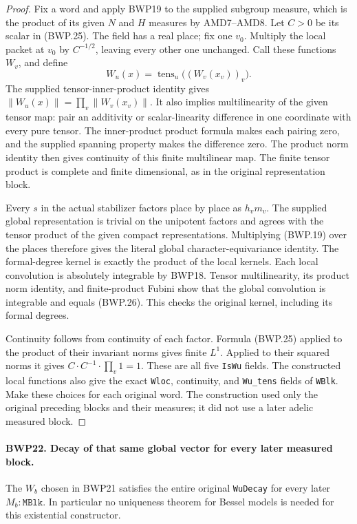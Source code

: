 \documentclass[11pt,a4paper]{article}
\numberwithin{equation}{section}
\theoremstyle{remark}\newtheorem{remark}[theorem]{Remark}
\begin{document}
\begin{proof}
Fix a word and apply BWP19 to the supplied subgroup measure,
which is the product of its given \(N\) and \(H\) measures by
AMD7--AMD8.  Let \(C>0\) be its scalar in (BWP.25).  The field
has a real place; fix one \(v_0\).  Multiply the local packet at
\(v_0\) by \(C^{-1/2}\), leaving every other one unchanged.
Call these functions \(W_v\), and define
\[
 W_u(x)=\operatorname{tens}_u\bigl((W_v(x_v))_v\bigr).
 \tag{BWP.26}
\]
The supplied tensor-inner-product identity gives
\(\|W_u(x)\|=\prod_v\|W_v(x_v)\|\).
It also implies multilinearity of the given tensor map: pair an
additivity or scalar-linearity difference in one coordinate with
every pure tensor.  The inner-product product formula makes each
pairing zero, and the supplied spanning property makes the difference
zero.  The product norm identity then gives continuity of this
finite multilinear map.
The finite tensor product is complete and finite dimensional,
as in the original representation block.

Every \(s\) in the actual stabilizer factors place by place as
\(h_vm_v\).  The supplied global representation is trivial on
the unipotent factors and agrees with the tensor product of the given
compact representations.  Multiplying (BWP.19) over the places
therefore gives the literal global character-equivariance identity.
The formal-degree kernel is exactly the product of the local kernels.
Each local convolution is absolutely integrable by BWP18.  Tensor
multilinearity, its product norm identity, and finite-product Fubini
show that the global convolution is integrable and equals (BWP.26).
This checks the original kernel, including its formal degrees.

Continuity follows from continuity of each factor.  Formula (BWP.25)
applied to the product of their invariant norms gives finite \(L^1\).
Applied to their squared norms it gives
\(C\cdot C^{-1}\cdot\prod_v1=1\).
These are all five \texttt{Is\allowbreak Wu} fields.  The constructed local
functions also give the exact \texttt{Wloc}, continuity, and
\texttt{Wu\_\allowbreak tens} fields of \texttt{WBlk}.
Make these choices for each original word.  The construction used
only the original preceding blocks and their measures; it did not
use a later adelic measured block.
\end{proof}

\paragraph{BWP22. Decay of that same global vector for every later measured block.}
\label{claim:BWP22}
The \(W_b\) chosen in BWP21 satisfies the entire original
\texttt{Wu\allowbreak Decay} for every later \(M_b:\texttt{MBlk}\).
In particular no uniqueness theorem for Bessel models is needed
for this existential constructor.
\end{document}
